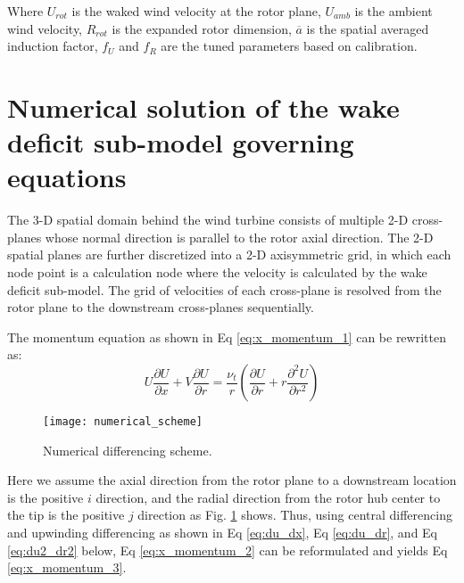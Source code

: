 \documentclass{umthesis}
\begin{document}
Where $U_{rot}$ is the waked wind velocity at the rotor plane, $U_{amb}$ is the ambient wind velocity, $R_{rot}$ is the expanded rotor dimension, $\overline{a}$ is the spatial averaged induction factor, $f_U$ and $f_R$ are the tuned parameters based on calibration.


\section{Numerical solution of the wake deficit sub-model governing equations} \label{sec:numerical solution}
The 3-D spatial domain behind the wind turbine consists of multiple 2-D cross-planes whose normal direction is parallel to the rotor axial direction. The 2-D spatial planes are further discretized into a 2-D axisymmetric grid, in which each node point is a calculation node where the velocity is calculated by the wake deficit sub-model. The grid of velocities of each cross-plane is resolved from the rotor plane to the downstream cross-planes sequentially.

The momentum equation as shown in Eq \ref{eq:x_momentum_1} can be rewritten as:
\begin{equation}\label{eq:x_momentum_2}
  U\frac{\partial U}{\partial x}+V\frac{\partial U}{\partial r}=\frac{\nu_t}{r}(\frac{\partial U}{\partial r}+r\frac{\partial^2 U}{\partial r^2})
\end{equation}

\begin{figure}
  \centering
  \texttt{[image: numerical\_scheme]}
  \caption{Numerical differencing scheme.}\label{fig:numerical_scheme}
\end{figure}


Here we assume the axial direction from the rotor plane to a downstream location is the positive $i$ direction, and the radial direction from the rotor hub center to the tip is the positive $j$ direction as Fig. \ref{fig:numerical_scheme} shows. Thus, using central differencing and upwinding differencing as shown in Eq \ref{eq:du_dx}, Eq \ref{eq:du_dr}, and Eq \ref{eq:du2_dr2} below,
Eq \ref{eq:x_momentum_2} can be reformulated and yields Eq \ref{eq:x_momentum_3}.
\end{document}
